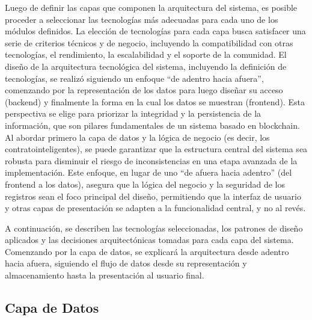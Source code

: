 Luego de definir las capas que componen la arquitectura del sistema, es posible proceder a seleccionar las tecnologías más adecuadas para cada uno de los módulos definidos. La elección de tecnologías para cada capa busca satisfacer una serie de criterios técnicos y de negocio, incluyendo la compatibilidad con otras tecnologías, el rendimiento, la escalabilidad y el soporte de la comunidad. El diseño de la arquitectura tecnológica del sistema, incluyendo la definición de tecnologías, se realizó siguiendo un enfoque ``de adentro hacia afuera'', comenzando por la representación de los datos para luego diseñar su acceso (\gls{backend}) y finalmente la forma en la cual los datos se muestran (\gls{frontend}). Esta perspectiva se elige para priorizar la integridad y la persistencia de la información, que son pilares fundamentales de un sistema basado en blockchain. Al abordar primero la capa de datos y la lógica de negocio (es decir, los \glspl{contratointeligente}), se puede garantizar que la estructura central del sistema sea robusta para disminuir el riesgo de inconsistencias en una etapa avanzada de la implementación. Este enfoque, en lugar de uno ``de afuera hacia adentro'' (del frontend a los datos), asegura que la lógica del negocio y la seguridad de los registros sean el foco principal del diseño, permitiendo que la interfaz de usuario y otras capas de presentación se adapten a la funcionalidad central, y no al revés.

A continuación, se describen las tecnologías seleccionadas, los patrones de diseño aplicados y las decisiones arquitectónicas tomadas para cada capa del sistema. Comenzando por la capa de datos, se explicará la arquitectura desde adentro hacia afuera, siguiendo el flujo de datos desde su representación y almacenamiento hasta la presentación al usuario final.

\subsection{Capa de Datos}

